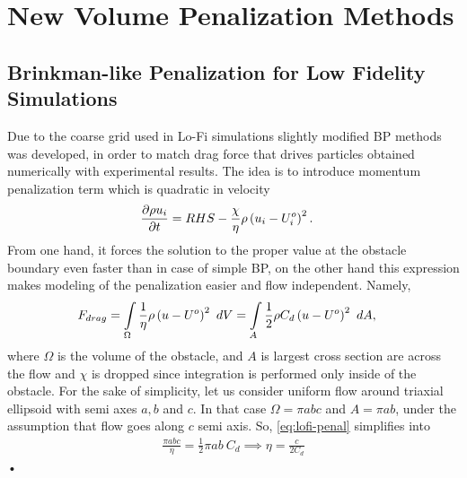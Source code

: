 \chapter{New Volume Penalization Methods}
\label{chapter:3}
\section{Brinkman-like Penalization for Low Fidelity Simulations}
Due to the coarse grid used in Lo-Fi simulations slightly modified BP methods was developed, in order to match drag force that drives particles obtained numerically with experimental results. The idea is to introduce momentum penalization term which is quadratic in velocity
\begin{align}
\frac {\partial \rho u_i}{\partial t} &= RHS - \frac \chi \eta \rho \left(u_i - U_i^o\right)^2.
\end{align}
From one hand, it forces the solution to the proper value at the obstacle boundary even faster than in case of simple BP, on the other hand this expression makes modeling of the penalization easier and flow independent. Namely, 
\begin{align}
F_{drag} &= \int\displaylimits_\Omega \frac 1 \eta \rho \rbr{u - U^o}^2\ dV = \int \displaylimits_A \frac 12 \rho C_d \rbr{u - U^o}^2\ dA, \label{eq:lofi-penal}
\end{align}
where $\Omega$ is the volume of the obstacle, and $A$ is largest cross section are across the flow and $\chi$ is dropped since integration is performed only inside of the obstacle. For the sake of simplicity, let us consider uniform flow around triaxial ellipsoid with semi axes $a,b$ and $c$. In that case $\Omega = \pi a b c$ and $A = \pi a b$, under the assumption that flow goes along $c$ semi axis. So, \eqref{eq:lofi-penal} simplifies into
\begin{align}
\frac {\pi a b c}\eta = \frac 12 \pi a b\ C_d \implies \eta = \frac c{2C_d}
\end{align}•
